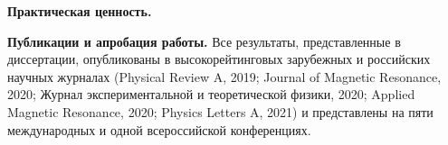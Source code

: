 \textbf{Практическая ценность.}


\textbf{Публикации и апробация работы.}
Все результаты, представленные в диссертации,
опубликованы в высокорейтинговых зарубежных и российских научных журналах (Physical Review A, 2019;  Journal of Magnetic Resonance, 2020; Журнал экспериментальной и теоретической физики, 2020; Applied Magnetic Resonance, 2020;  Physics Letters A, 2021) и представлены на пяти международных и одной всероссийской конференциях.



%

%
%





%
%
%
%

